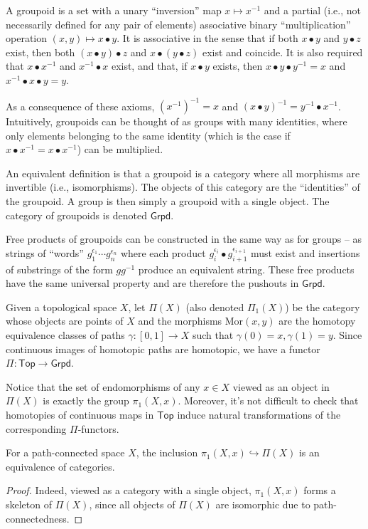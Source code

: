 \begin{defn}[Groupoid]
    A groupoid is a set with a unary ``inversion'' map $x\mapsto x^{-1}$ and a partial (i.e., not necessarily defined for any pair of elements) associative binary ``multiplication'' operation $(x,y)\mapsto x\bullet y$. It is associative in the sense that if both $x\bullet y$ and $y\bullet z$ exist, then both $(x\bullet y)\bullet z$ and $x\bullet (y\bullet z)$ exist and coincide. It is also required that $x\bullet x^{-1}$ and $x^{-1}\bullet x$ exist, and that, if $x\bullet y$ exists, then $x\bullet y\bullet y^{-1}=x$ and $x^{-1}\bullet x\bullet y=y$.

   As a consequence of these axioms, $(x^{-1})^{-1}=x$ and $(x\bullet y)^{-1}=y^{-1}\bullet x^{-1}$. Intuitively, groupoids can be thought of as groups with many identities, where only elements belonging to the same identity (which is the case if $x\bullet x^{-1}=x\bullet x^{-1}$) can be multiplied. 
    
    An equivalent definition is that a groupoid is a category where all morphisms are invertible (i.e., isomorphisms). The objects of this category are the ``identities'' of the groupoid. A group is then simply a groupoid with a single object. The category of groupoids is denoted $\mathsf{Grpd}$.
\end{defn}

Free products of groupoids can be constructed in the same way as for groups -- as strings of ``words'' $g_1^{\epsilon_1} \cdots g_n^{\epsilon_n}$ where each product $g_i^{\epsilon_i}\bullet g_{i+1}^{\epsilon_{i+1}}$ must exist and insertions of substrings of the form $gg^{-1}$ produce an equivalent string. These free products have the same universal property and are therefore the pushouts in $\mathsf{Grpd}$.

\begin{defn}
    Given a topological space $X$, let $\Pi(X)$ (also denoted $\Pi_1(X)$) be the category whose objects are points of $X$ and the morphisms $\mathrm{Mor}(x,y)$ are the homotopy equivalence classes of paths $\gamma:[0,1]\to X$ such that $\gamma(0)=x, \gamma(1)=y$. Since continuous images of homotopic paths are homotopic, we have a functor $\Pi:\mathsf{Top}\to \mathsf{Grpd}$.
\end{defn}
Notice that the set of endomorphisms of any $x\in X$ viewed as an object in $\Pi(X)$ is exactly the group $\pi_1(X,x)$. Moreover, it's not difficult to check that homotopies of continuous maps in $\mathsf{Top}$ induce natural transformations of the corresponding $\Pi$-functors.
\begin{prop}
    For a path-connected space $X$, the inclusion $\pi_1(X,x)\hookrightarrow \Pi(X)$ is an equivalence of categories.
\end{prop}
\begin{proof}
    Indeed, viewed as a category with a single object, $\pi_1(X,x)$ forms a skeleton of $\Pi(X)$, since all objects of $\Pi(X)$ are isomorphic due to path-connectedness.
\end{proof}

